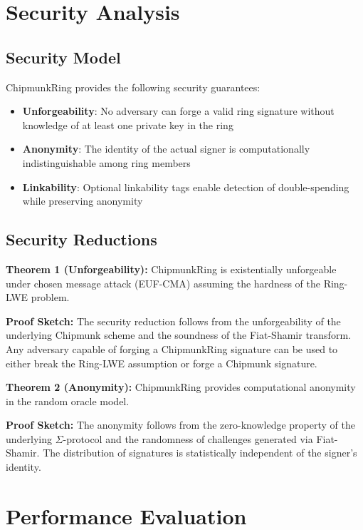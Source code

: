\documentclass[11pt,a4paper]{article}
\begin{document}
\section{Security Analysis}

\subsection{Security Model}

ChipmunkRing provides the following security guarantees:

\begin{itemize}
\item \textbf{Unforgeability}: No adversary can forge a valid ring signature without knowledge of at least one private key in the ring
\item \textbf{Anonymity}: The identity of the actual signer is computationally indistinguishable among ring members
\item \textbf{Linkability}: Optional linkability tags enable detection of double-spending while preserving anonymity
\end{itemize}

\subsection{Security Reductions}

\textbf{Theorem 1 (Unforgeability):} ChipmunkRing is existentially unforgeable under chosen message attack (EUF-CMA) assuming the hardness of the Ring-LWE problem.

\textbf{Proof Sketch:} The security reduction follows from the unforgeability of the underlying Chipmunk scheme and the soundness of the Fiat-Shamir transform. Any adversary capable of forging a ChipmunkRing signature can be used to either break the Ring-LWE assumption or forge a Chipmunk signature.

\textbf{Theorem 2 (Anonymity):} ChipmunkRing provides computational anonymity in the random oracle model.

\textbf{Proof Sketch:} The anonymity follows from the zero-knowledge property of the underlying $\Sigma$-protocol and the randomness of challenges generated via Fiat-Shamir. The distribution of signatures is statistically independent of the signer's identity.

\section{Performance Evaluation}
\end{document}
